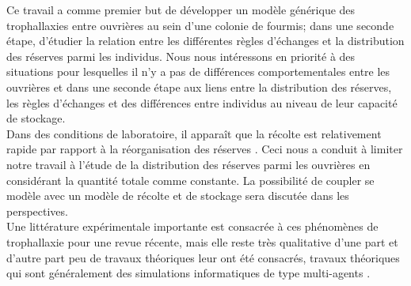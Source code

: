 Ce travail a comme premier but de développer un modèle générique des trophallaxies entre ouvrières au sein d'une colonie de fourmis; dans une seconde étape, d'étudier la relation entre les différentes règles d'échanges et la distribution des réserves parmi les individus. Nous nous intéressons en priorité à des situations pour lesquelles il n'y a pas de différences comportementales entre les ouvrières et dans une seconde étape aux liens entre la distribution des réserves, les règles d'échanges et des différences entre individus au niveau de leur capacité de stockage.\\

Dans des conditions de laboratoire, il apparaît que la récolte est relativement rapide par rapport à la réorganisation des réserves  \citep{buffin_feeding_2009,buffin_collective_2012}. Ceci nous a conduit à limiter notre travail à l'étude de la distribution des réserves parmi les ouvrières en considérant la quantité totale comme constante. La possibilité de coupler se modèle avec un modèle de récolte et de stockage sera discutée dans les perspectives.\\

Une littérature expérimentale importante est consacrée à ces phénomènes de trophallaxie \citep{richard_intracolony_2013} pour une revue récente, mais elle reste très qualitative d'une part et d'autre part peu de travaux théoriques leur ont été consacrés, travaux théoriques qui sont généralement des simulations informatiques de type multi-agents \citep{schmickl_trophallaxis_2007}.

%
%
%

